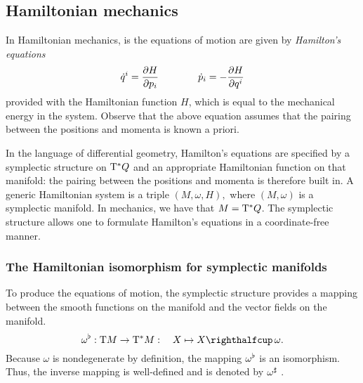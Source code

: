 \subsection{Hamiltonian mechanics}
\label{ssec:symplectic_ham_systems}
In Hamiltonian mechanics, is the equations of motion are given by \emph{Hamilton's equations}
\begin{equation}
     \dot{q}^i = \pdv{H}{p_i} \qquad\qquad \dot{p}_i = -\pdv{H}{q^i}
     \label{eq:hamilton_equations}
\end{equation}
provided with the Hamiltonian function \(H\), which is equal to the mechanical energy in the system. Observe that the above equation assumes that the pairing between the positions and momenta is known a priori. 

In the language of differential geometry, Hamilton's equations are specified by a symplectic structure on \(\mathrm{T}^*Q\) and an appropriate Hamiltonian function on that manifold: the pairing between the positions and momenta is therefore built in. A generic Hamiltonian system is a triple \( (M, \omega, H), \) where \( (M, \omega) \) is a symplectic manifold. In mechanics, we have that \( M = \mathrm{T}^*Q \). The symplectic structure allows one to formulate Hamilton's equations in a coordinate-free manner.

\subsubsection{The Hamiltonian isomorphism for symplectic manifolds}
To produce the equations of motion, the symplectic structure provides a mapping between the smooth functions on the manifold and the vector fields on the manifold.%
\begin{equation}
    \toDual{\omega}: \tbundle{M} \to \ctbundle{M}:\quad X \mapsto \intpr{X}{\omega}. 
    \label{eq:symplectic_isomorphism}
\end{equation}
Because \(\omega\) is nondegenerate by definition, the mapping \(\omega^\flat\) is an isomorphism. Thus, the inverse mapping is well-defined and is denoted by \(\omega^\sharp\) \cite{Libermann1987}.

